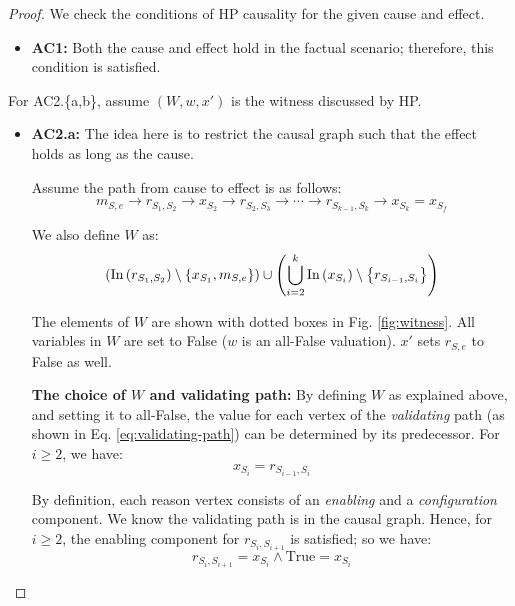 \begin{proof}
We check the conditions of HP causality for the given cause and effect.

\begin{itemize}
  \item \textbf{AC1:} Both the cause and effect hold in the factual scenario;
  therefore, this condition is satisfied.
\end{itemize}

For AC2.\{a,b\}, assume $(W, w, x')$ is the witness discussed by HP.

\begin{itemize}  
  \item \textbf{AC2.a:} The idea here is to restrict the causal graph
  such that the effect holds as long as the cause.
  
  Assume the path from cause to effect is as follows:
  \begin{equation}\label{eq:validating-path}
    m_{S,e} \rightarrow
    r_{S_1,S_2} \rightarrow
    x_{S_2} \rightarrow
    r_{S_2, S_3} \rightarrow
    \cdots \rightarrow
    r_{S_{k-1}, S_k} \rightarrow x_{S_k} = x_{S_f}
  \end{equation}

  We also define $W$ as:
  \[ \left( \text{In} \left( r_{S_1, S_2} \right) \setminus \left\{ x_{S_1}, m_{S,e} \right\} \right) \cup
    \left( \bigcup_{i=2}^k \text{In} \left( x_{S_i} \right) \setminus \left\{ r_{S_{i-1}, S_i} \right\} \right) \]
   
  The elements of $W$ are shown with dotted boxes in Fig. \ref{fig:witness}.
  All variables in $W$ are set to False ($w$ is an all-False valuation).
  $x'$ sets $r_{S,e}$ to False as well.
  
  \textbf{The choice of $W$ and validating path:}
  By defining $W$ as explained above, and setting it to all-False,
  the value for each vertex of the \textit{validating} path
  (as shown in Eq. \ref{eq:validating-path})
  can be determined by its predecessor. For $i \geq 2$, we have:
  \begin{equation}\label{eq:x-Si-restrict}
    x_{S_i} = r_{S_{i-1}, S_i}
  \end{equation}
  
  By definition, each reason vertex consists of
  an \textit{enabling} and a \textit{configuration} component.
  We know the validating path is in the causal graph. Hence, for $i \geq 2$,
  the enabling component for $r_{S_i, S_{i+1}}$ is satisfied; so we have:
  \begin{equation}\label{eq:r-Si-Si+1-restrict}
    r_{S_i, S_{i+1}} = x_{S_i} \wedge \text{True} = x_{S_i}
  \end{equation}
  

\end{itemize}
\end{proof}
